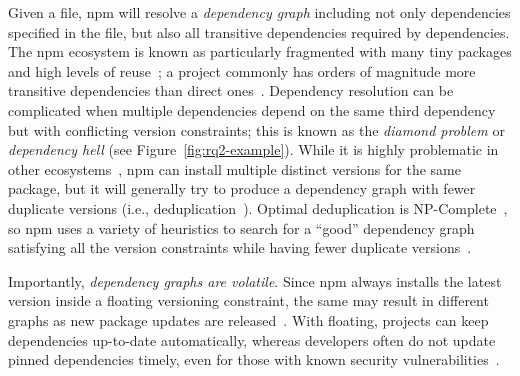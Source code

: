 Given a  file, npm will resolve a \textit{dependency graph} including not only dependencies specified in the  file, but also all transitive dependencies required by dependencies.
The npm ecosystem is known as particularly fragmented with many tiny packages and high levels of reuse~\cite{DBLP:conf/sigsoft/AbdalkareemNWMS17, DBLP:journals/ese/DecanMG19}; a project commonly has orders of magnitude more transitive dependencies than direct ones~\cite{DBLP:journals/ese/DecanMG19}.
Dependency resolution can be complicated when multiple dependencies depend on the same third dependency but with conflicting version constraints; this is known as the \textit{diamond problem} or \textit{dependency hell} (see Figure~\ref{fig:rq2-example}). 
While it is highly problematic in other ecosystems~\cite{fan2020escaping,mancinelli2006managing,DBLP:conf/wcre/AbateCGZ20,DBLP:journals/tosem/BogartKHT21}, npm can install multiple distinct versions for the same package, but it will generally try to produce a dependency graph with fewer duplicate versions (i.e., deduplication~\cite{npm-install}). 
Optimal deduplication is NP-Complete~\cite{DBLP:conf/wcre/AbateCGZ20}, so npm uses a variety of heuristics to search for a ``good'' dependency graph satisfying all the version constraints while having fewer duplicate versions~\cite{npm-install}. 

Importantly, \emph{dependency graphs are volatile}. 
Since npm always installs the latest version inside a floating versioning constraint, the same  may result in different graphs as new package updates are released~\cite{DBLP:conf/icse/LiuCF00022}.
With floating, projects can keep dependencies up-to-date automatically, whereas developers often do not update pinned dependencies timely, even for those with known security vulnerabilities~\cite{DBLP:conf/icse/CoxBEV15, DBLP:journals/ese/KulaGOII18, DBLP:journals/tse/HeHZZ23}.

